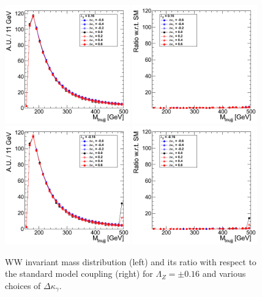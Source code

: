 \begin{figure}[h!t]
  {\centering
    \includegraphics[width=0.48\textwidth]{figs/Mass4Body_016.png}
    \includegraphics[width=0.48\textwidth]{figs/Mass4Body_016_ratio.png}
    \includegraphics[width=0.48\textwidth]{figs/Mass4Body_m016.png}
    \includegraphics[width=0.48\textwidth]{figs/Mass4Body_m016_ratio.png}
    \caption{WW invariant mass distribution (left) and its ratio with respect to 
    the standard model coupling (right) for $\Lambda_Z = \pm 0.16$ and various choices of $\Delta{\kappa_\gamma}$.}
    \label{fig:ww_Mass4Body_atgcRatio016}}
\end{figure}
